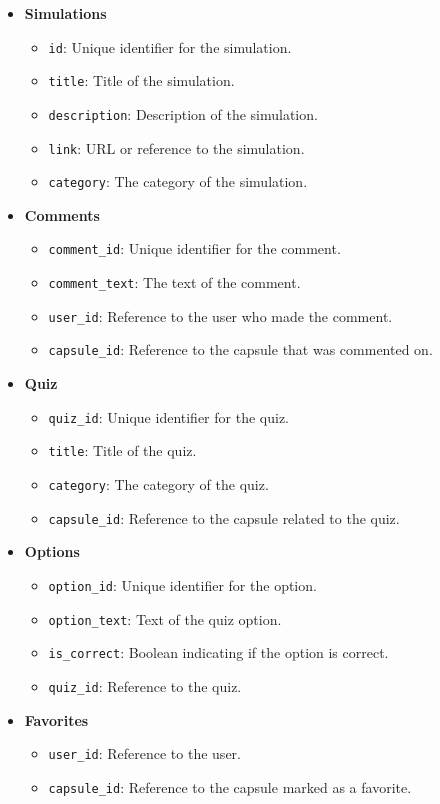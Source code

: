 \begin{itemize}
    \item \textbf{Simulations}
    \begin{itemize}
        \item \texttt{id}: Unique identifier for the simulation.
        \item \texttt{title}: Title of the simulation.
        \item \texttt{description}: Description of the simulation.
        \item \texttt{link}: URL or reference to the simulation.
        \item \texttt{category}: The category of the simulation.
    \end{itemize}
    
    \item \textbf{Comments}
    \begin{itemize}
        \item \texttt{comment\_id}: Unique identifier for the comment.
        \item \texttt{comment\_text}: The text of the comment.
        \item \texttt{user\_id}: Reference to the user who made the comment.
        \item \texttt{capsule\_id}: Reference to the capsule that was commented on.
    \end{itemize}
    
    \item \textbf{Quiz}
    \begin{itemize}
        \item \texttt{quiz\_id}: Unique identifier for the quiz.
        \item \texttt{title}: Title of the quiz.
        \item \texttt{category}: The category of the quiz.
        \item \texttt{capsule\_id}: Reference to the capsule related to the quiz.
    \end{itemize}
    \item \textbf{Options}
    \begin{itemize}
        \item \texttt{option\_id}: Unique identifier for the option.
        \item \texttt{option\_text}: Text of the quiz option.
        \item \texttt{is\_correct}: Boolean indicating if the option is correct.
        \item \texttt{quiz\_id}: Reference to the quiz.
    \end{itemize}
    
    \item \textbf{Favorites}
    \begin{itemize}
        \item \texttt{user\_id}: Reference to the user.
        \item \texttt{capsule\_id}: Reference to the capsule marked as a favorite.
    \end{itemize}
\end{itemize}
